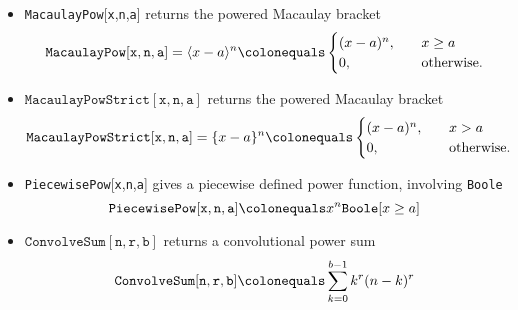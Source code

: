 \documentclass[12pt, letterpaper]{amsart}
\newenvironment{myitemize}
{ \begin{itemize}
    \setlength{\itemsep}{4pt}
    \setlength{\parskip}{4pt}
    \setlength{\parsep}{4pt}     }
{ \end{itemize}                  }
\newcommand \power [2]{\langle #1 \rangle^{#2}}
\newcommand \curvepower [2]{\{ #1 \}^{#2}}
\newcommand \coeffA [3][coeffA]{\texttt{#1}[{\texttt{#2}},{\texttt{#3}}]}
\newcommand \MacaulayPow [4][MacaulayPow]{\texttt{#1}[{\texttt{#2}},{\texttt{#3}},{\texttt{#4}}]}
\newcommand \MacaulayPowStrict [4][MacaulayPowStrict]{\texttt{#1}[{\texttt{#2}},{\texttt{#3}},{\texttt{#4}}]}
\newcommand \PiecewisePow [4][PiecewisePow]{\texttt{#1}[{\texttt{#2}},{\texttt{#3}},{\texttt{#4}}]}
\newcommand \ConvolveSum [4][ConvolveSum]{\texttt{{#1}} [{\texttt{#2}},{\texttt{#3}},{\texttt{#4}}]}
\theoremstyle{definition}
\theoremstyle{remark}
\numberwithin{equation}{section}
\begin{document}
\begin{myitemize}
\begin{equation*}
\begin{split}
 =\sum_{r=0}^{m} \coeffA{m}{r} \sum_{k=0}^{b-1} k^r(n-k)^r
 =\sum_{r=0}^{m} \coeffA{m}{r} \convSumFixed{r}{n}{b} \\
&=\sum_{r=0}^{m} \coeffA{m}{r} \sum_{k=0}^{b-1} k^r \sum_{j=0}^{r} (-1)^j \binom{r}{j} n^{r-j} k^j
 =\sum_{r=0}^{m} \sum_{j=0}^{r} (-1)^j n^{r-j} \binom{r}{j} \coeffA{m}{r} \sum_{k=0}^{b-1} k^{r+j} \\
&= \sum_{r=0}^{m} \sum_{j=0}^{r} n^{r-j} \binom{r}{j} \coeffA{m}{r} \frac{(-1)^j}{r+j+1} \sum_{s=0}^{r+j} \binom{r+j+1}{s} B_s (b-1)^{r+j-s+1}
\end{split}
\end{equation*}
\item \MacaulayPow{x}{n}{a} returns the powered Macaulay bracket
\begin{equation*}
\MacaulayPow{x}{n}{a}=\power{x-a}{n} \colonequals
\begin{cases}
(x-a)^n, &\quad x\geq a \\
0, &\quad \mathrm{otherwise}.
\end{cases}
\end{equation*}
\item $\MacaulayPowStrict{x}{n}{a}$ returns the powered Macaulay bracket
\begin{equation*}
\MacaulayPowStrict{x}{n}{a} = \curvepower{x-a}{n} \colonequals
\begin{cases}
(x-a)^n, &\quad x>a \\
0, &\quad \mathrm{otherwise}.
\end{cases}
\end{equation*}
\item \PiecewisePow{x}{n}{a} gives a piecewise defined power function, involving \texttt{Boole}
\begin{equation*}
\PiecewisePow{x}{n}{a} \colonequals x^n\texttt{Boole}[x\geq a]
\end{equation*}
\item $\ConvolveSum{n}{r}{b}$ returns a convolutional power sum
\begin{equation*}
\label{q_definition}
\ConvolveSum{n}{r}{b} \colonequals \sum_{k=0}^{b-1} k^r(n-k)^r
\end{equation*}
\end{myitemize}
\end{document}
